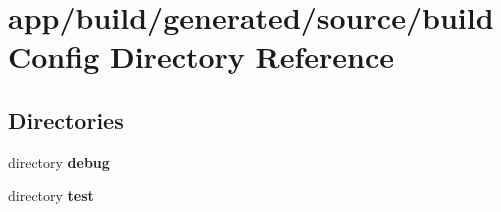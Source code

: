 \section{app/build/generated/source/build\+Config Directory Reference}
\label{dir_8d6d3bbd5bcb08e7e1c7de044f9737f3}
\subsection*{Directories}
\begin{DoxyCompactItemize}
\item 
directory {\bf debug}
\item 
directory {\bf test}
\end{DoxyCompactItemize}
